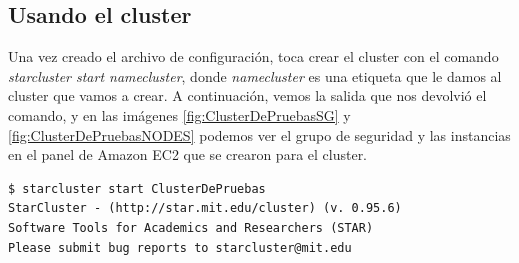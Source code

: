\documentclass{article}
\begin{document}
\subsection{Usando el cluster}
	Una vez creado el archivo de configuración, toca crear el cluster con el comando \emph{starcluster start namecluster}, donde \emph{namecluster} es una etiqueta que le damos al cluster que vamos a crear. A continuación, vemos la salida que nos devolvió el comando, y en las imágenes \ref{fig:ClusterDePruebasSG} y \ref{fig:ClusterDePruebasNODES} podemos ver el grupo de seguridad y las instancias en el panel de Amazon EC2 que se crearon para el cluster.
\begin{lstlisting}[style=miniBash]
$ starcluster start ClusterDePruebas
StarCluster - (http://star.mit.edu/cluster) (v. 0.95.6)
Software Tools for Academics and Researchers (STAR)
Please submit bug reports to starcluster@mit.edu


\end{lstlisting}
\end{document}
